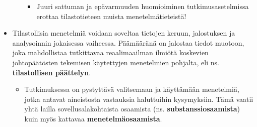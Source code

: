 \documentclass[
]{book}
\providecommand{\tightlist}{%
  \setlength{\itemsep}{0pt}\setlength{\parskip}{0pt}}
\begin{document}
\begin{itemize}
\begin{itemize}
    \begin{itemize}
    \tightlist
    \item
      Juuri sattuman ja epävarmuuden huomioiminen tutkimusasetelmissa erottaa tilastotieteen muista menetelmätieteistä!
    \end{itemize}
  \end{itemize}
\item
  Tilastollisia menetelmiä voidaan soveltaa tietojen keruun, jalostuksen ja analysoinnin jokaisessa vaiheessa. Päämääränä on jalostaa tiedot muotoon, joka mahdollistaa tutkittavaa reaalimaailman ilmiötä koskevien johtopäätösten tekemisen käytettyjen menetelmien pohjalta, eli ns. \textbf{tilastollisen päättelyn}.

  \begin{itemize}
  \tightlist
  \item
    Tutkimuksessa on pystyttävä valitsemaan ja käyttämään menetelmiä, jotka antavat aineistosta vastauksia haluttuihin kysymyksiin. Tämä vaatii yhtä lailla sovellusalakohtaista osaamista (ns. \textbf{substanssiosaamista}) kuin myös kattavaa \textbf{menetelmäosaamista}.
  \end{itemize}
\end{itemize}

\hfill\break
\hfill\break
\end{document}
